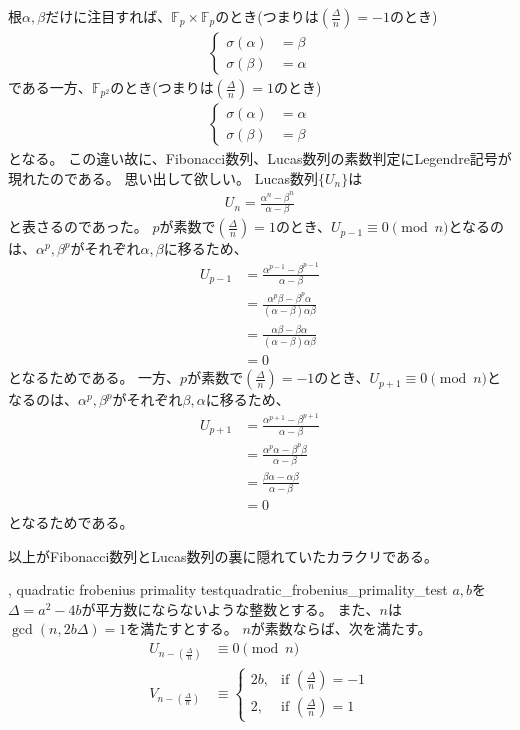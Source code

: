 根$\alpha,\beta$だけに注目すれば、$\mathbb{F}_p\times\mathbb{F}_p$のとき(つまりは$\left(\frac{\Delta}{n}\right)=-1$のとき)
\begin{align*}
\begin{cases}
\sigma(\alpha) &= \beta\\
\sigma(\beta) &= \alpha
\end{cases}
\end{align*}
である一方、$\mathbb{F}_{p^2}$のとき(つまりは$\left(\frac{\Delta}{n}\right)=1$のとき)
\begin{align*}
\begin{cases}
\sigma(\alpha) &= \alpha\\
\sigma(\beta) &= \beta
\end{cases}
\end{align*}
となる。
この違い故に、Fibonacci数列、Lucas数列の素数判定にLegendre記号が現れたのである。
思い出して欲しい。
Lucas数列$\{U_n\}$は
\begin{align*}
U_n = \frac{\alpha^n - \beta^n}{\alpha - \beta}
\end{align*}
と表さるのであった。
$p$が素数で$\left(\frac{\Delta}{n}\right)=1$のとき、$U_{p-1} \equiv 0 \pmod{n}$となるのは、$\alpha^p,\beta^p$がそれぞれ$\alpha,\beta$に移るため、
\begin{align*}
U_{p-1} &= \frac{\alpha^{p-1} - \beta^{p-1}}{\alpha - \beta}\\
&= \frac{\alpha^p\beta - \beta^p\alpha}{(\alpha-\beta)\alpha\beta}\\
&= \frac{\alpha\beta - \beta\alpha}{(\alpha-\beta)\alpha\beta}\\
&= 0
\end{align*}
となるためである。
一方、$p$が素数で$\left(\frac{\Delta}{n}\right)=-1$のとき、$U_{p+1} \equiv 0 \pmod{n}$となるのは、$\alpha^p,\beta^p$がそれぞれ$\beta,\alpha$に移るため、
\begin{align*}
U_{p+1} &= \frac{\alpha^{p+1} - \beta^{p+1}}{\alpha - \beta}\\
&= \frac{\alpha^p\alpha - \beta^p\beta}{\alpha-\beta}\\
&= \frac{\beta\alpha - \alpha\beta}{\alpha-\beta}\\
&= 0
\end{align*}
となるためである。

以上がFibonacci数列とLucas数列の裏に隠れていたカラクリである。

\begin{Theo}{, quadratic frobenius primality test}{quadratic_frobenius_primality_test}
$a,b$を$\Delta=a^2-4b$が平方数にならないような整数とする。
また、$n$は$\gcd(n,2b\Delta)=1$を満たすとする。
$n$が素数ならば、次を満たす。
\begin{align*}
U_{n - \left(\frac{\Delta}{n}\right)} &\equiv 0 \pmod{n}\\
V_{n - \left(\frac{\Delta}{n}\right)} &\equiv
\begin{cases}
2b, &\mbox{if } \left(\frac{\Delta}{n}\right) = -1\\
2,  &\mbox{if } \left(\frac{\Delta}{n}\right) = 1
\end{cases}
\end{align*}
\end{Theo}
